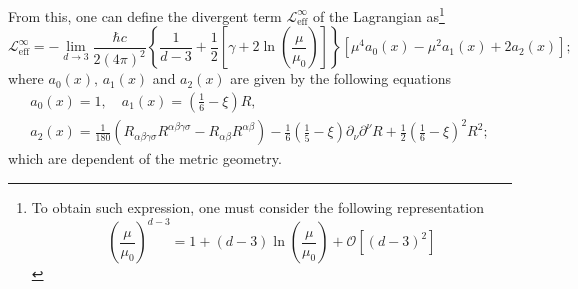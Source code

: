From this, one can define the divergent term $\mathcal{L}_{\text{eff}}^\infty$ of the Lagrangian as\footnote{To obtain such expression, one must consider the following representation $$\left(\frac{\mu}{\mu_0}\right)^{d-3}=1+(d-3)\ln\left(\frac{\mu}{\mu_0}\right)+\mathcal{O}\left[(d-3)^2\right]$$}
\begin{equation}
	\mathcal{L}_{\text{eff}}^\infty=-\lim\limits_{d\to 3}\frac{\hbar c}{2(4\pi)^2}\left\{\frac{1}{d-3}+\frac{1}{2}\left[\gamma+2\ln\left(\frac{\mu}{\mu_0}\right)\right]\right\}\left[\mu^4a_0(x)-\mu^2a_1(x)+2a_2(x)\right];
\end{equation}
where  $a_0(x),\,a_1(x)$ and $a_2(x)$ are given by the following equations
\begin{subequations}
	\begin{gather}
		a_0(x)=1,\quad a_1(x)=\left(\frac{1}{6}-\xi\right)R,\tag{\theequation \,\,a,b}\\
		a_2(x)=\frac{1}{180}\left(R_{\alpha\beta\gamma\sigma}R^{\alpha\beta\gamma\sigma}-R_{\alpha\beta}R^{\alpha\beta}\right)-\frac{1}{6}\left(\frac{1}{5}-\xi\right)\partial_\nu\partial^\nu R+\frac{1}{2}\left(\frac{1}{6}-\xi\right)^2R^2;\tag{\theequation \,\,c}
	\end{gather}
\end{subequations}
which are dependent of the metric geometry.


